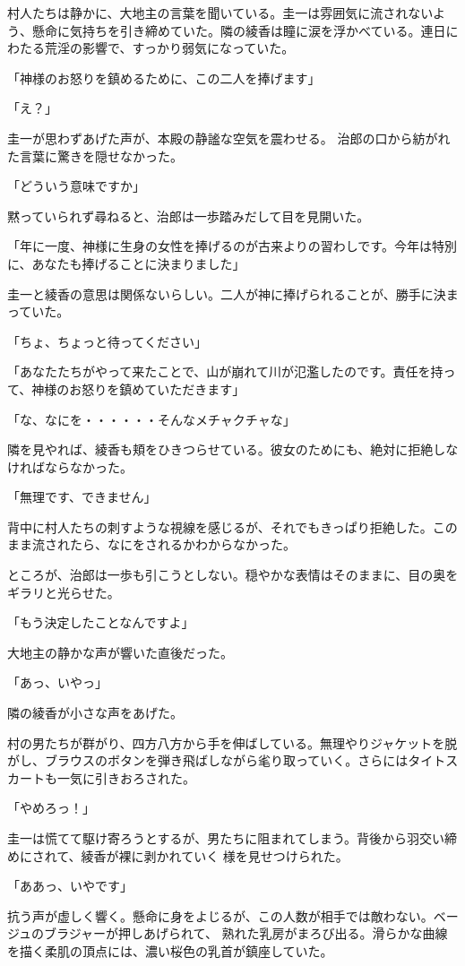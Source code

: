 ﻿\documentclass[book,tate]{jlreq}
\begin{document}
村人たちは静かに、大地主の言葉を聞いている。圭一は雰囲気に流されないよう、懸命に気持ちを引き締めていた。隣の綾香は瞳に涙を浮かべている。連日にわたる荒淫の影響で、すっかり弱気になっていた。

「神様のお怒りを鎮めるために、この二人を捧げます」

「え？」

圭一が思わずあげた声が、本殿の静謐な空気を震わせる。 治郎の口から紡がれた言葉に驚きを隠せなかった。

「どういう意味ですか」

黙っていられず尋ねると、治郎は一歩踏みだして目を見開いた。

「年に一度、神様に生身の女性を捧げるのが古来よりの習わしです。今年は特別に、あなたも捧げることに決まりました」

圭一と綾香の意思は関係ないらしい。二人が神に捧げられることが、勝手に決まっていた。

「ちょ、ちょっと待ってください」

「あなたたちがやって来たことで、山が崩れて川が氾濫したのです。責任を持って、神様のお怒りを鎮めていただきます」

「な、なにを・・・・・・そんなメチャクチャな」

隣を見やれば、綾香も頬をひきつらせている。彼女のためにも、絶対に拒絶しなければならなかった。

「無理です、できません」

背中に村人たちの刺すような視線を感じるが、それでもきっぱり拒絶した。このまま流されたら、なにをされるかわからなかった。

ところが、治郎は一歩も引こうとしない。穏やかな表情はそのままに、目の奥をギラリと光らせた。

「もう決定したことなんですよ」

大地主の静かな声が響いた直後だった。

「あっ、いやっ」

隣の綾香が小さな声をあげた。

村の男たちが群がり、四方八方から手を伸ばしている。無理やりジャケットを脱がし、ブラウスのボタンを弾き飛ばしながら毟り取っていく。さらにはタイトスカートも一気に引きおろされた。

「やめろっ！」

圭一は慌てて駆け寄ろうとするが、男たちに阻まれてしまう。背後から羽交い締めにされて、綾香が裸に剥かれていく 様を見せつけられた。

「ああっ、いやです」

抗う声が虚しく響く。懸命に身をよじるが、この人数が相手では敵わない。ベージュのブラジャーが押しあげられて、 熟れた乳房がまろび出る。滑らかな曲線を描く柔肌の頂点には、濃い桜色の乳首が鎮座していた。
\end{document}
